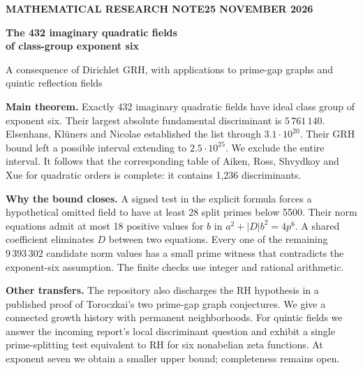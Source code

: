 \documentclass[11pt,letterpaper]{article}
\begin{document}
\thispagestyle{plain}
{\small\sffamily\bfseries\color{link} MATHEMATICAL RESEARCH NOTE\hfill 25 NOVEMBER 2026}\par
\vspace{.30in}
{\fontsize{27}{32}\selectfont\bfseries\color{ink} The 432 imaginary quadratic fields\\ of class-group exponent six\par}
\vspace{.11in}
{\large A consequence of Dirichlet GRH, with applications to prime-gap graphs and quintic reflection fields}\par
\vspace{.21in}

\textbf{Main theorem.} Exactly 432 imaginary quadratic fields have ideal class group of exponent six. Their largest absolute fundamental discriminant is $5\,761\,140$. Elsenhans, Kl\"uners and Nicolae established the list through $3.1\cdot10^{20}$. Their GRH bound left a possible interval extending to $2.5\cdot10^{25}$. We exclude the entire interval. It follows that the corresponding table of Aiken, Ross, Shvydkoy and Xue for quadratic orders is complete: it contains 1,236 discriminants.

\textbf{Why the bound closes.} A signed test in the explicit formula forces a hypothetical omitted field to have at least 28 split primes below 5500. Their norm equations admit at most 18 positive values for $b$ in $a^2+|D|b^2=4p^6$. A shared coefficient eliminates $D$ between two equations. Every one of the remaining $9\,393\,302$ candidate norm values has a small prime witness that contradicts the exponent-six assumption. The finite checks use integer and rational arithmetic.

\textbf{Other transfers.} The repository also discharges the RH hypothesis in a published proof of Toroczkai's two prime-gap graph conjectures. We give a connected growth history with permanent neighborhoods. For quintic fields we answer the incoming report's local discriminant question and exhibit a single prime-splitting test equivalent to RH for six nonabelian zeta functions. At exponent seven we obtain a smaller upper bound; completeness remains open.
\smallskip
\tableofcontents

\clearpage
\end{document}
